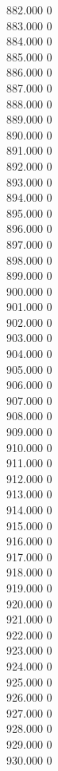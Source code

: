 { 882.000	0 \\
 883.000	0 \\
 884.000	0 \\
 885.000	0 \\
 886.000	0 \\
 887.000	0 \\
 888.000	0 \\
 889.000	0 \\
 890.000	0 \\
 891.000	0 \\
 892.000	0 \\
 893.000	0 \\
 894.000	0 \\
 895.000	0 \\
 896.000	0 \\
 897.000	0 \\
 898.000	0 \\
 899.000	0 \\
 900.000	0 \\
 901.000	0 \\
 902.000	0 \\
 903.000	0 \\
 904.000	0 \\
 905.000	0 \\
 906.000	0 \\
 907.000	0 \\
 908.000	0 \\
 909.000	0 \\
 910.000	0 \\
 911.000	0 \\
 912.000	0 \\
 913.000	0 \\
 914.000	0 \\
 915.000	0 \\
 916.000	0 \\
 917.000	0 \\
 918.000	0 \\
 919.000	0 \\
 920.000	0 \\
 921.000	0 \\
 922.000	0 \\
 923.000	0 \\
 924.000	0 \\
 925.000	0 \\
 926.000	0 \\
 927.000	0 \\
 928.000	0 \\
 929.000	0 \\
 930.000	0 \\
}
